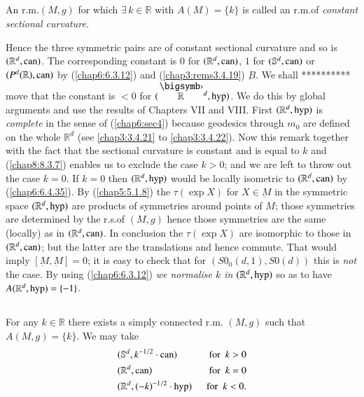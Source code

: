 \setcounter{subsection}{14}

\subsection{}\label{chap6:6.2.15}

\begin{defi*}
An r.m.\@ $(M,g)$ for which $\exists\, k\in\mathbb{R}$ with
$A(M)=\{k\}$ is called an r.m.\@ of {\em constant sectional
  curvature.}
\end{defi*}

Hence the three symmetric pairs are of constant sectional curvature
and so is $(\mathbb{R}^{d},\operatorname{can})$. The corresponding constant is $0$
for $(\mathbb{R}^{d},\operatorname{can})$, $1$ for $(\mathbb{S}^{d},\operatorname{can})$ or
$(P^{d}(\mathbb{R}),\operatorname{can})$ by (\ref{chap6:6.3.12}) and (\ref{chap3:rems3.4.19})
$\underbar{B}$. We shall ********** move that the
constant \pageoriginale is $<0$ for
$({\overset{\bigdot}{\mathbb{R}}}{}^{d},\hyp)$. We do this by global
arguments and use the results of Chapters VII and VIII. First
$(\mathbb{R}^{d},\operatorname{hyp})$ is {\em complete} in the sense of
(\ref{chap6:sec4}) because geodesics through $m_{0}$ are defined on the
whole $\mathbb{R}^{d}$ (see \ref{chap3:3.4.21} to \ref{chap3:3.4.22}). Now
this remark together with the fact that the sectional curvature is
constant and is equal to $k$ and (\ref{chap8:8.3.7}) enables us to exclude
the case $k>0$; and we are left to throw out the case $k=0$. If $k=0$
then $(\mathbb{R}^{d},\operatorname{hyp})$ would be locally isometric to
$(\mathbb{R}^{d},\operatorname{can})$ by (\ref{chap6:6.4.35}). By (\ref{chap5:5.1.8}) the
$\tau(\exp X)$ for $X\in \underbar{M}$ in the symmetric space
$(\mathbb{R}^{d},\operatorname{hyp})$ are products of symmetries around points of
$M$; those symmetries are determined by the r.s.\@ of $(M,g)$ hence
those symmetries are the same (locally) as in
$(\mathbb{R}^{d},\operatorname{can})$. In conclusion the $\tau(\exp X)$ are
isomorphic to those in $(\mathbb{R}^{d},\operatorname{can})$; but the latter are the
translations and hence commute. That would imply
$[\underbar{M},\underbar{M}]=0$; it is easy to check that for
$(S0_{0}(d,1),S0(d))$ this is {\em not} the case. By using
(\ref{chap6:6.3.12}) {\em we normalise $k$ in $(\mathbb{R}^{d},\operatorname{hyp})$} so as
to have $A(\mathbb{R}^{d},\operatorname{hyp})=\{-1\}$.

\subsection{}\label{chap6:6.2.16}

\begin{prop*}
For any $k\in\mathbb{R}$ there exists a simply connected r.m.\@
$(M,g)$ such that $A(M,g)=\{k\}$. We may take
\begin{alignat*}{2}
& (\mathbb{S}^{d}, k^{-1/2}\cdot \operatorname{can}) &\text{ \ for \ } k>0\\
& (\mathbb{R}^{d},\operatorname{can}) & \text{ \ for \ } k=0\\
& (\mathbb{R}^{d},(-k)^{-1/2}\cdot \operatorname{hyp}) &\text{ \ for \ } k<0.
\end{alignat*}
\end{prop*}

